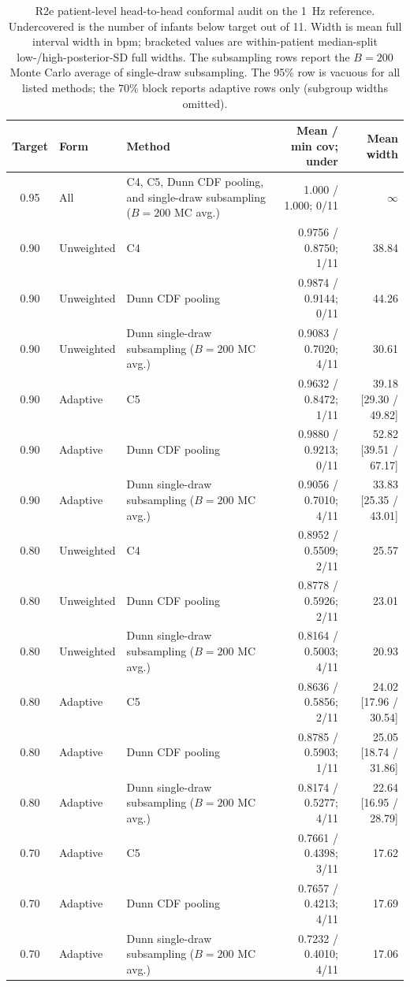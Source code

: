 \begin{table}[htbp]
\centering
\footnotesize
\setlength{\tabcolsep}{4pt}
\caption{R2e patient-level head-to-head conformal audit on the 1~Hz reference. Undercovered is the number of infants below target out of 11. Width is mean full interval width in bpm; bracketed values are within-patient median-split low-/high-posterior-SD full widths. The subsampling rows report the $B=200$ Monte Carlo average of single-draw subsampling. The 95\% row is vacuous for all listed methods; the 70\% block reports adaptive rows only (subgroup widths omitted).}
\label{tab:ch5_dunn_comparison}
\begin{tabularx}{\textwidth}{@{}c l >{\raggedright\arraybackslash}X r r@{}}
\toprule
Target & Form & Method & Mean / min cov; under & Mean width \\
\midrule
0.95 & All & C4, C5, Dunn CDF pooling, and single-draw subsampling ($B=200$ MC avg.) & 1.000 / 1.000; 0/11 & $\infty$ \\
\midrule
0.90 & Unweighted & C4 & 0.9756 / 0.8750; 1/11 & 38.84 \\
0.90 & Unweighted & Dunn CDF pooling & 0.9874 / 0.9144; 0/11 & 44.26 \\
0.90 & Unweighted & Dunn single-draw subsampling ($B=200$ MC avg.) & 0.9083 / 0.7020; 4/11 & 30.61 \\
0.90 & Adaptive & C5 & 0.9632 / 0.8472; 1/11 & 39.18 [29.30 / 49.82] \\
0.90 & Adaptive & Dunn CDF pooling & 0.9880 / 0.9213; 0/11 & 52.82 [39.51 / 67.17] \\
0.90 & Adaptive & Dunn single-draw subsampling ($B=200$ MC avg.) & 0.9056 / 0.7010; 4/11 & 33.83 [25.35 / 43.01] \\
\midrule
0.80 & Unweighted & C4 & 0.8952 / 0.5509; 2/11 & 25.57 \\
0.80 & Unweighted & Dunn CDF pooling & 0.8778 / 0.5926; 2/11 & 23.01 \\
0.80 & Unweighted & Dunn single-draw subsampling ($B=200$ MC avg.) & 0.8164 / 0.5003; 4/11 & 20.93 \\
0.80 & Adaptive & C5 & 0.8636 / 0.5856; 2/11 & 24.02 [17.96 / 30.54] \\
0.80 & Adaptive & Dunn CDF pooling & 0.8785 / 0.5903; 1/11 & 25.05 [18.74 / 31.86] \\
0.80 & Adaptive & Dunn single-draw subsampling ($B=200$ MC avg.) & 0.8174 / 0.5277; 4/11 & 22.64 [16.95 / 28.79] \\
\midrule
0.70 & Adaptive & C5 & 0.7661 / 0.4398; 3/11 & 17.62 \\
0.70 & Adaptive & Dunn CDF pooling & 0.7657 / 0.4213; 4/11 & 17.69 \\
0.70 & Adaptive & Dunn single-draw subsampling ($B=200$ MC avg.) & 0.7232 / 0.4010; 4/11 & 17.06 \\
\bottomrule
\end{tabularx}
\end{table}

